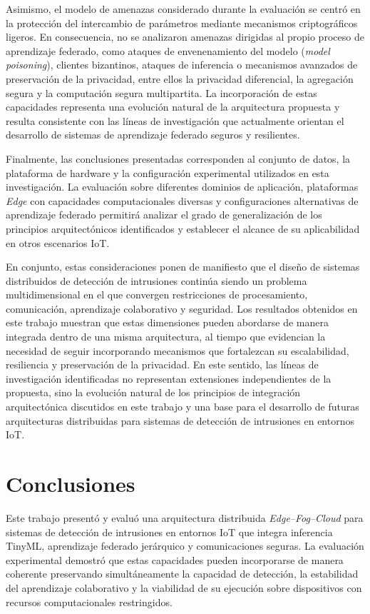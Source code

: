 \documentclass[journal,article,submit,moreauthors]{Definitions/mdpi}
\begin{document}
Asimismo, el modelo de amenazas considerado durante la evaluación se centró en la protección del intercambio de parámetros mediante mecanismos criptográficos ligeros. En consecuencia, no se analizaron amenazas dirigidas al propio proceso de aprendizaje federado, como ataques de envenenamiento del modelo (\textit{model poisoning}), clientes bizantinos, ataques de inferencia o mecanismos avanzados de preservación de la privacidad, entre ellos la privacidad diferencial, la agregación segura y la computación segura multipartita. La incorporación de estas capacidades representa una evolución natural de la arquitectura propuesta y resulta consistente con las líneas de investigación que actualmente orientan el desarrollo de sistemas de aprendizaje federado seguros y resilientes.

Finalmente, las conclusiones presentadas corresponden al conjunto de datos, la plataforma de hardware y la configuración experimental utilizados en esta investigación. La evaluación sobre diferentes dominios de aplicación, plataformas \textit{Edge} con capacidades computacionales diversas y configuraciones alternativas de aprendizaje federado permitirá analizar el grado de generalización de los principios arquitectónicos identificados y establecer el alcance de su aplicabilidad en otros escenarios IoT.

En conjunto, estas consideraciones ponen de manifiesto que el diseño de sistemas distribuidos de detección de intrusiones continúa siendo un problema multidimensional en el que convergen restricciones de procesamiento, comunicación, aprendizaje colaborativo y seguridad. Los resultados obtenidos en este trabajo muestran que estas dimensiones pueden abordarse de manera integrada dentro de una misma arquitectura, al tiempo que evidencian la necesidad de seguir incorporando mecanismos que fortalezcan su escalabilidad, resiliencia y preservación de la privacidad. En este sentido, las líneas de investigación identificadas no representan extensiones independientes de la propuesta, sino la evolución natural de los principios de integración arquitectónica discutidos en este trabajo y una base para el desarrollo de futuras arquitecturas distribuidas para sistemas de detección de intrusiones en entornos IoT.


\section{Conclusiones}

Este trabajo presentó y evaluó una arquitectura distribuida \textit{Edge--Fog--Cloud} para sistemas de detección de intrusiones en entornos IoT que integra inferencia TinyML, aprendizaje federado jerárquico y comunicaciones seguras. La evaluación experimental demostró que estas capacidades pueden incorporarse de manera coherente preservando simultáneamente la capacidad de detección, la estabilidad del aprendizaje colaborativo y la viabilidad de su ejecución sobre dispositivos con recursos computacionales restringidos.
\end{document}
